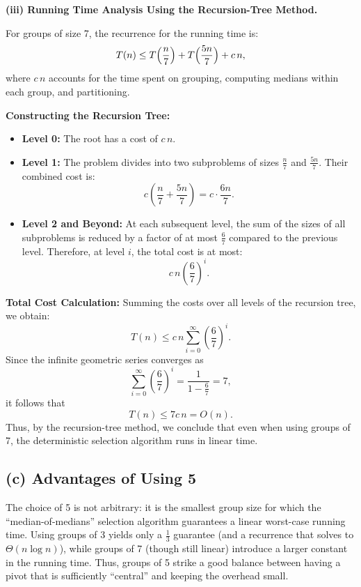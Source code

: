 \documentclass[11pt]{article}
\begin{document}
    \medskip
    
    \textbf{(iii) Running Time Analysis Using the Recursion-Tree Method.}  
    
    For groups of size 7, the recurrence for the running time is:
    \[
    T(n) \le T\Bigl(\frac{n}{7}\Bigr) + T\Bigl(\frac{5n}{7}\Bigr) + c\,n,
    \]
    where \(c\,n\) accounts for the time spent on grouping, computing medians within each group, and partitioning.
    
    \textbf{Constructing the Recursion Tree:}  
    \begin{itemize}
        \item \textbf{Level 0:} The root has a cost of \(c\,n\).
        \item \textbf{Level 1:} The problem divides into two subproblems of sizes \(\frac{n}{7}\) and \(\frac{5n}{7}\). Their combined cost is:
        \[
        c\left(\frac{n}{7} + \frac{5n}{7}\right) = c\cdot\frac{6n}{7}.
        \]
        \item \textbf{Level 2 and Beyond:} At each subsequent level, the sum of the sizes of all subproblems is reduced by a factor of at most \(\frac{6}{7}\) compared to the previous level. Therefore, at level \(i\), the total cost is at most:
        \[
        c\,n \left(\frac{6}{7}\right)^i.
        \]
    \end{itemize}
    
    \textbf{Total Cost Calculation:}  
    Summing the costs over all levels of the recursion tree, we obtain:
    \[
    T(n) \le c\,n \sum_{i=0}^{\infty} \left(\frac{6}{7}\right)^i.
    \]
    Since the infinite geometric series converges as
    \[
    \sum_{i=0}^{\infty} \left(\frac{6}{7}\right)^i = \frac{1}{1 - \frac{6}{7}} = 7,
    \]
    it follows that
    \[
    T(n) \le 7c\,n = O(n).
    \]
    Thus, by the recursion-tree method, we conclude that even when using groups of 7, the deterministic selection algorithm runs in linear time.

    \bigskip
    
    \subsection*{(c) Advantages of Using 5}  
    The choice of 5 is not arbitrary: it is the smallest group size for which the “median-of-medians” selection algorithm guarantees a linear worst-case running time. Using groups of 3 yields only a \(\frac{1}{3}\) guarantee (and a recurrence that solves to \(\Theta(n\log n)\)), while groups of 7 (though still linear) introduce a larger constant in the running time. Thus, groups of 5 strike a good balance between having a pivot that is sufficiently “central” and keeping the overhead small.
    
\end{document}
